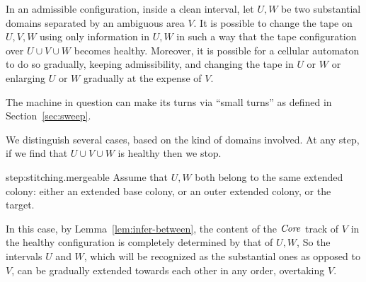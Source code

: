 \documentclass[11pt]{memoir}
\theoremstyle{definition} %
\newcommand{\fld}[1]{\ensuremath{\textit{#1\/}}}
\newcommand{\Core}{\fld{Core}}
\newcommand{\Sweep}{\fld{Sweep}}
\begin{document}
\begin{lemma}[Stitching]\label{lem:stitching}
In an admissible configuration, inside a clean interval,
let \( U,W \) be two substantial domains separated by an ambiguous area \( V \).
It is possible to change the tape on \( U,V,W \) using only information in \( U,W \) in such a 
way that the tape configuration over \( U\cup V\cup W \) becomes healthy.
Moreover, it is possible for a cellular automaton to do so gradually, keeping admissibility, and
changing the tape in \( U \) or \( W \) or enlarging \( U \) or \( W \)
gradually at the expense of \( V \).

The machine in question can make its turns via
``small turns'' as defined in Section~\ref{sec:sweep}.
\end{lemma}
\begin{Proof}
We distinguish several cases, based on the kind of domains involved.
At any step, if we find that \( U\cup V\cup W \) is healthy then we stop.
\begin{step+}{step:stitching.mergeable}
Assume that \( U,W \) both belong to the same extended colony: either an extended base colony, or 
an outer extended colony, or the target.
\end{step+}
\begin{prooof}
In this case, by Lemma~\ref{lem:infer-between}, the content of the \( \Core \) track 
of \( V \) in the healthy configuration is completely determined by that of \( U,W \),
So the intervals \( U \) and \( W \), which will be recognized as the substantial ones as
opposed to \( V \), can be gradually extended towards each other in any order, 
overtaking \( V \).





\end{prooof}
\end{Proof}
\end{document}
